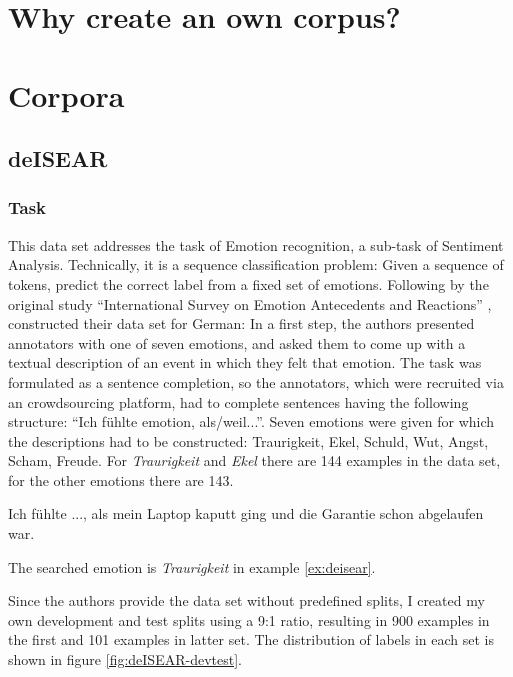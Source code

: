 
\label{chap:5_dataset}

\section{Why create an own corpus?}

\section{Corpora}

\subsection{deISEAR}

\subsubsection{Task}

This data set addresses the task of Emotion recognition, a sub-task of Sentiment Analysis.
Technically, it is a sequence classification problem: Given a sequence of tokens, predict the correct label from a fixed set of emotions.
Following by the original study ``International Survey on Emotion Antecedents and Reactions'' \citep{scherer1994evidence}, \cite{troiano2019crowdsourcing} constructed their data set for German:
In a first step, the authors presented annotators with one of seven emotions, and asked them to come up with a textual description of an event in which they felt that emotion.
The task was formulated as a sentence completion, so the annotators, which were recruited via an crowdsourcing platform, had to complete sentences having the following structure: ``Ich fühlte {emotion}, als/weil...''.
Seven emotions were given for which the descriptions had to be constructed:
Traurigkeit, Ekel, Schuld, Wut, Angst, Scham, Freude.
For \emph{Traurigkeit} and \emph{Ekel} there are 144 examples in the data set, for the other emotions there are 143.

\begin{examples}
	\label{ex:deisear}
	\item Ich fühlte ..., als mein Laptop kaputt ging und die Garantie schon abgelaufen war.
\end{examples}

The searched emotion is \emph{Traurigkeit} in example \ref{ex:deisear}.

Since the authors provide the data set without predefined splits, I created my own development and test splits using a 9:1 ratio, resulting in 900 examples in the first and 101 examples in latter set.
The distribution of labels in each set is shown in figure \ref{fig:deISEAR-devtest}.

